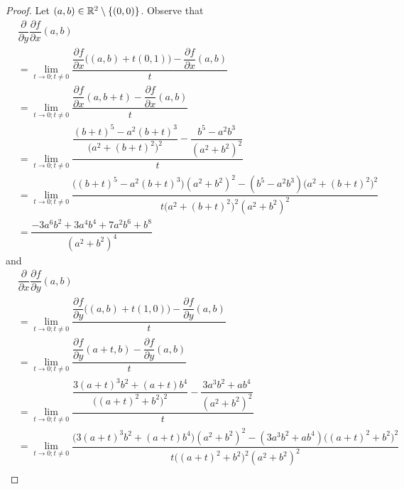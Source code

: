 \begin{proof}
  Let \((a, b) \in \mathbb{R}^2 \setminus \left\lbrace(0, 0)\right\rbrace\).
  Observe that
  \begin{align*}
     & \dfrac{\partial}{\partial y} \dfrac{\partial f}{\partial x}(a, b)                                                                                                                \\
     & = \lim_{t \to 0 ; t \neq 0} \dfrac{\dfrac{\partial f}{\partial x}\big((a, b) + t(0, 1)\big) - \dfrac{\partial f}{\partial x}(a, b)}{t}                                           \\
     & = \lim_{t \to 0 ; t \neq 0} \dfrac{\dfrac{\partial f}{\partial x}(a, b + t) - \dfrac{\partial f}{\partial x}(a, b)}{t}                                                           \\
     & = \lim_{t \to 0 ; t \neq 0} \dfrac{\dfrac{(b + t)^5 - a^2 (b + t)^3}{\big(a^2 + (b + t)^2\big)^2} - \dfrac{b^5 - a^2 b^3}{(a^2 + b^2)^2}}{t}                                     \\
     & = \lim_{t \to 0 ; t \neq 0} \dfrac{\big((b + t)^5 - a^2 (b + t)^3\big) (a^2 + b^2)^2 - (b^5 - a^2 b^3) \big(a^2 + (b + t)^2\big)^2}{t \big(a^2 + (b + t)^2\big)^2 (a^2 + b^2)^2} \\
     & = \dfrac{-3 a^6 b^2 + 3 a^4 b^4 + 7 a^2 b^6 + b^8}{(a^2 + b^2)^4}
  \end{align*}
  and
  \begin{align*}
     & \dfrac{\partial}{\partial x} \dfrac{\partial f}{\partial y}(a, b)                                                                                                                        \\
     & = \lim_{t \to 0 ; t \neq 0} \dfrac{\dfrac{\partial f}{\partial y}\big((a, b) + t(1, 0)\big) - \dfrac{\partial f}{\partial y}(a, b)}{t}                                                   \\
     & = \lim_{t \to 0 ; t \neq 0} \dfrac{\dfrac{\partial f}{\partial y}(a + t, b) - \dfrac{\partial f}{\partial y}(a, b)}{t}                                                                   \\
     & = \lim_{t \to 0 ; t \neq 0} \dfrac{\dfrac{3 (a + t)^3 b^2 + (a + t) b^4}{\big((a + t)^2 + b^2\big)^2} - \dfrac{3 a^3 b^2 + a b^4}{(a^2 + b^2)^2}}{t}                                     \\
     & = \lim_{t \to 0 ; t \neq 0} \dfrac{\big(3 (a + t)^3 b^2 + (a + t) b^4\big) (a^2 + b^2)^2 - (3 a^3 b^2 + a b^4) \big((a + t)^2 + b^2\big)^2}{t \big((a + t)^2 + b^2\big)^2 (a^2 + b^2)^2} \\

\end{align*}
\end{proof}
